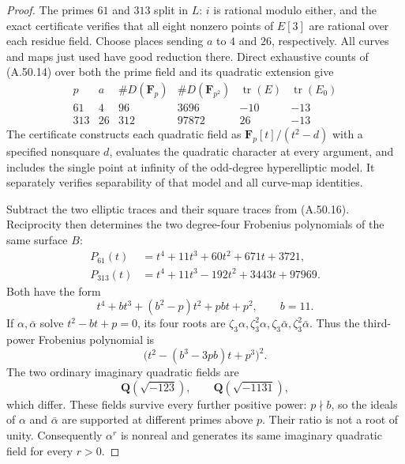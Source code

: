 \begin{proof}
The primes \(61\) and \(313\) split in \(L\):
\(i\) is rational modulo either, and the exact
certificate verifies that all eight nonzero points
of \(E[3]\) are rational over each residue field.
Choose places sending \(a\) to \(4\) and
\(26\), respectively. All curves and maps just
used have good reduction there. Direct exhaustive
counts of (A.50.14) over both the prime field and
its quadratic extension give
\[
\begin{array}{c|r|r|r|r|r}
p&a&\#D(\mathbf F_p)&\#D(\mathbf F_{p^2})
  &\operatorname{tr}(E)&\operatorname{tr}(E_0)\\\hline
61&4&96&3696&-10&-13\\
313&26&312&97872&26&-13
\end{array}                                                     \tag{A.50.16}
\]
The certificate constructs each quadratic field as
\(\mathbf F_p[t]/(t^2-d)\) with a specified
nonsquare \(d\), evaluates the quadratic character
at every argument, and includes the single point
at infinity of the odd-degree hyperelliptic model.
It separately verifies separability of that model
and all curve-map identities.

Subtract the two elliptic traces and their square
traces from (A.50.16). Reciprocity then determines
the two degree-four Frobenius polynomials of the
same surface \(B\):
\[
\begin{aligned}
 P_{61}(t)&=t^4+11t^3+60t^2+671t+3721,\\
 P_{313}(t)&=t^4+11t^3-192t^2+3443t+97969.
\end{aligned}                                                  \tag{A.50.17}
\]
Both have the form
\[
                  t^4+b t^3+(b^2-p)t^2+pb t+p^2,
                         \qquad b=11.              \tag{A.50.18}
\]
If \(\alpha,\bar\alpha\) solve
\(t^2-bt+p=0\), its four roots are
\(\zeta_3\alpha,\zeta_3^2\alpha,
  \zeta_3\bar\alpha,\zeta_3^2\bar\alpha\).
Thus the third-power Frobenius polynomial is
\[
             \bigl(t^2-(b^3-3pb)t+p^3\bigr)^2.
                                                               \tag{A.50.19}
\]
The two ordinary imaginary quadratic fields are
\[
             \mathbf Q(\sqrt{-123}),\qquad
             \mathbf Q(\sqrt{-1131}),               \tag{A.50.20}
\]
which differ. These fields survive every further
positive power: \(p\nmid b\), so the ideals of
\(\alpha\) and \(\bar\alpha\) are supported
at different primes above \(p\). Their ratio is
not a root of unity. Consequently \(\alpha^r\)
is nonreal and generates its same imaginary
quadratic field for every \(r>0\).


\end{proof}
